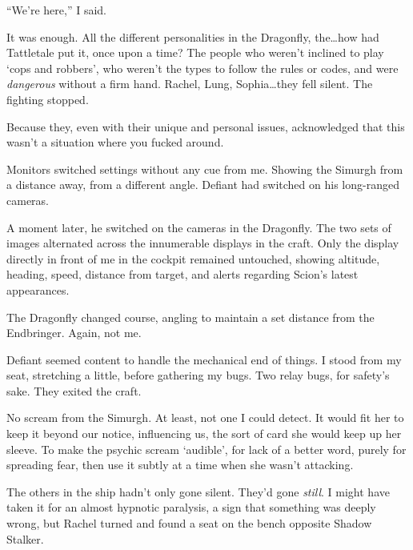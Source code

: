 





``We're here,'' I said.



It was enough.  All the different personalities in the Dragonfly, the\ldots how had Tattletale put it, once upon a time?  The people who weren't inclined to play `cops and robbers', who weren't the types to follow the rules or codes, and were \emph{dangerous} without a firm hand.  Rachel, Lung, Sophia\ldots they fell silent.  The fighting stopped.



Because they, even with their unique and personal issues, acknowledged that this wasn't a situation where you fucked around.



Monitors switched settings without any cue from me.  Showing the Simurgh from a distance away, from a different angle.  Defiant had switched on his long-ranged cameras.



A moment later, he switched on the cameras in the Dragonfly.  The two sets of images alternated across the innumerable displays in the craft.  Only the display directly in front of me in the cockpit remained untouched, showing altitude, heading, speed, distance from target, and alerts regarding Scion's latest appearances.



The Dragonfly changed course, angling to maintain a set distance from the Endbringer.  Again, not me.



Defiant seemed content to handle the mechanical end of things.  I stood from my seat, stretching a little, before gathering my bugs.  Two relay bugs, for safety's sake.  They exited the craft.



No scream from the Simurgh.  At least, not one I could detect.  It would fit her to keep it beyond our notice, influencing us, the sort of card she would keep up her sleeve.  To make the psychic scream `audible', for lack of a better word, purely for spreading fear, then use it subtly at a time when she wasn't attacking.



The others in the ship hadn't only gone silent.  They'd gone \emph{still}.  I might have taken it for an almost hypnotic paralysis, a sign that something was deeply wrong, but Rachel turned and found a seat on the bench opposite Shadow Stalker.



